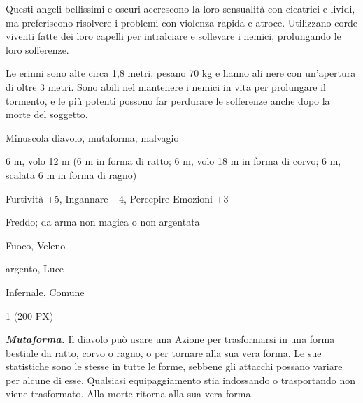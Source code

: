 \begin{multicols}{2}
{Questi angeli bellissimi e oscuri accrescono la loro sensualità con cicatrici e lividi, ma preferiscono risolvere i problemi con violenza rapida e atroce. Utilizzano corde viventi fatte dei loro capelli per intralciare e sollevare i nemici, prolungando le loro sofferenze.

Le erinni sono alte circa 1,8 metri, pesano 70 kg e hanno ali nere con un'apertura di oltre 3 metri. Sono abili nel mantenere i nemici in vita per prolungare il tormento, e le più potenti possono far perdurare le sofferenze anche dopo la morte del soggetto.

\begin{description}[noitemsep, topsep=0pt, parsep=0pt, partopsep=0pt, itemsep=1pt, leftmargin=2.35cm,  labelwidth=2.2cm, itemindent=0cm, listparindent=0pt] %
\setlength{\baselineskip}{10pt}
\item[\textbf{Taglia/Tipo}] Minuscola diavolo, mutaforma, malvagio
\item[\textbf{Caratt.}] 
\item[\textbf{Punti Ferita}] 
\item[\textbf{Movimento}] 6 m, volo 12 m (6 m in forma di ratto; 6 m, volo 18 m in forma di corvo; 6 m, scalata 6 m in forma di ragno)
\item[\textbf{Tiri Salvez.}] 
\item[\textbf{Comp.}] Furtività +5, Ingannare +4, Percepire Emozioni +3
\item[\textbf{Res. Danni}] Freddo; da arma non magica o non argentata
\item[\textbf{Imm. Danni}] Fuoco, Veleno
\item[\textbf{Vulnerabilità}] argento, Luce
\item[\textbf{Sensi}] 
\item[\textbf{Linguaggi}] Infernale, Comune
\item[\textbf{Sfida}] 1 (200 PX)
\end{description}
\smallskip

\emph{\textbf{Mutaforma.}} Il diavolo può usare una Azione per trasformarsi in una forma bestiale da ratto, corvo o ragno, o per tornare alla sua vera forma. Le sue statistiche sono le stesse in tutte le forme, sebbene gli attacchi possano variare per alcune di esse. Qualsiasi equipaggiamento stia indossando o trasportando non viene trasformato. Alla morte ritorna alla sua vera forma.

}
\end{multicols}
